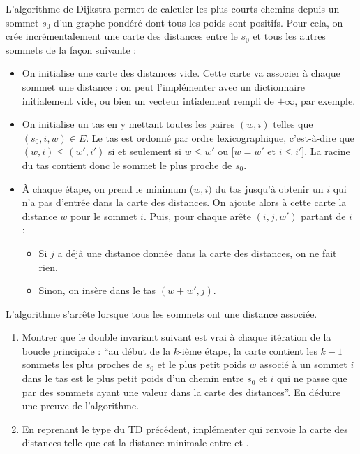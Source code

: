 \documentclass{article}
\begin{document}
L'algorithme de Dijkstra permet de calculer les plus courts chemins depuis un sommet $s_0$ d'un graphe pondéré dont tous les poids sont positifs. Pour cela, on crée incrémentalement une carte des distances entre le $s_0$ et tous les autres sommets de la façon suivante :
\begin{itemize}
	\item On initialise une carte des distances vide. Cette carte va associer à chaque sommet une distance : on peut l'implémenter avec un dictionnaire initialement vide, ou bien un vecteur intialement rempli de $+\infty$, par exemple.
	\item On initialise un tas en y mettant toutes les paires $(w, i)$ telles que $(s_0, i, w)\in E$. Le tas est ordonné par ordre lexicographique, c'est-à-dire que $(w, i) \le (w', i')$ si et seulement si $w \le w'$ ou [$w = w'$ et $i \le i'$]. La racine du tas contient donc le sommet le plus proche de $s_0$.
	\item À chaque étape, on prend le minimum ($w, i)$ du tas jusqu'à obtenir un $i$ qui n'a pas d'entrée dans la carte des distances. On ajoute alors à cette carte la distance $w$ pour le sommet $i$. Puis, pour chaque arête $(i, j, w')$ partant de $i$ :
	\begin{itemize}
		\item Si $j$ a déjà une distance donnée dans la carte des distances, on ne fait rien.
		\item Sinon, on insère dans le tas $(w + w', j)$.
	\end{itemize}
\end{itemize}
L'algorithme s'arrête lorsque tous les sommets ont une distance associée.

\begin{enumerate}
	\item Montrer que le double invariant suivant est vrai à chaque itération de la boucle principale : ``au début de la $k$-ième étape, la carte contient les $k-1$ sommets les plus proches de $s_0$ et le plus petit poids $w$ associé à un sommet $i$ dans le tas est le plus petit poids d'un chemin entre $s_0$ et $i$ qui ne passe que par des sommets ayant une valeur dans la carte des distances''. En déduire une preuve de l'algorithme.
	
	\item En reprenant le type  du TD précédent, implémenter  qui renvoie la carte des distances  telle que  est la distance minimale entre  et .
\end{enumerate}
	
\end{document}
